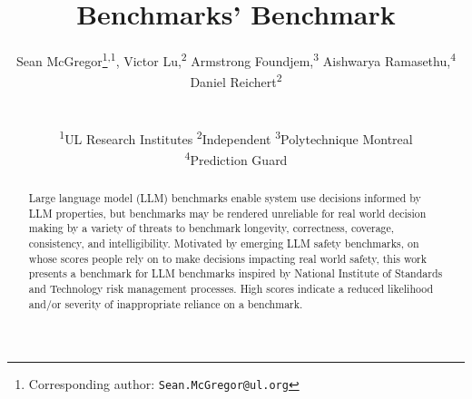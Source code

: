 \documentclass{article}
\title{Benchmarks' Benchmark}
\author{%
  Sean McGregor\thanks{Corresponding author: \texttt{Sean.McGregor@ul.org}}\textsuperscript{,1},
  Victor Lu,\textsuperscript{2}
  Armstrong Foundjem,\textsuperscript{3}
  Aishwarya Ramasethu,\textsuperscript{4}
  Daniel Reichert\textsuperscript{2} \\
   \\
  \\
  \textsuperscript{1}UL Research Institutes \textsuperscript{2}Independent
\textsuperscript{3}Polytechnique Montreal
\\
\textsuperscript{4}Prediction Guard
}
\begin{document}
\maketitle

\begin{abstract}
Large language model (LLM) benchmarks enable system use decisions informed by LLM properties, but benchmarks may be rendered unreliable for real world decision making by a variety of threats to benchmark longevity, correctness, coverage, consistency, and intelligibility. Motivated by emerging LLM safety benchmarks, on whose scores people rely on to make decisions impacting real world safety, this work presents a benchmark for LLM benchmarks inspired by National Institute of Standards and Technology risk management processes. High scores indicate a reduced likelihood and/or severity of inappropriate reliance on a benchmark.
\end{abstract}






% 
\end{document}
